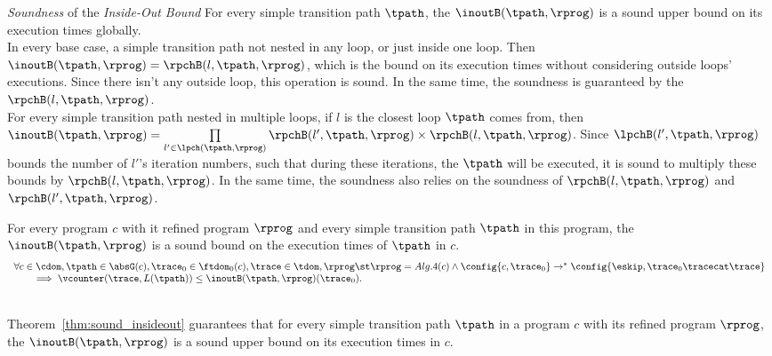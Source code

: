 \emph{Soundness} of the \emph{Inside-Out Bound}  
For every simple transition path $\tpath$, the $\inoutB(\tpath, \rprog)$
is a sound upper bound on its execution times globally.
\\
In every base case, a simple transition path not nested in any loop, or just inside one loop.
Then $\inoutB(\tpath, \rprog) = \rpchB(l, \tpath, \rprog)$, which is the bound on its execution times without considering
outside loops' executions. Since there isn't any outside loop, this operation is sound.
In the same time, the soundness is guaranteed by the $\rpchB(l, \tpath, \rprog)$.
\\
For every simple transition path nested in multiple loops, if $l$ is the closest loop $\tpath$ comes from, then
$\inoutB(\tpath, \rprog) =
\prod\limits_{l' \in \lpch(\tpath, \rprog)} \rpchB(l', \tpath, \rprog) \times \rpchB(l, \tpath, \rprog)$.
Since $\lpchB(l', \tpath, \rprog)$ bounds the number of $l'$'s iteration numbers,
such that during these iterations, the $\tpath$ will be executed,
it is sound to multiply these bounds by $\rpchB(l, \tpath, \rprog)$.
In the same time, the soundness also relies on the soundness of $\rpchB(l, \tpath, \rprog)$ and $\rpchB(l', \tpath, \rprog)$. 
%
\begin{thm}
  \label{thm:sound_insideout}
  For every program $c$ with it refined program $\rprog$ and 
  every simple transition path $\tpath$ in this program,
   the $\inoutB(\tpath, \rprog)$
is a sound bound on the execution times of $\tpath$ in $c$.
  \[
    \begin{array}{l}
    \forall c \in \cdom, \tpath \in \absG(c), \trace_0 \in \ftdom_0(c), \trace \in \tdom, \rprog \st 
    \rprog = Alg.4(c)
    \land
    \config{c, \trace_0} \to^* 
    \config{{\eskip, \trace_0 \tracecat \trace}}
    \\ \qquad
    \implies
    \vcounter(\trace, L(\tpath)) \leq \inoutB(\tpath, \rprog)(\trace_0).
    \end{array}
    \]
\end{thm}
\\
Theorem~\ref{thm:sound_insideout} guarantees that
for every simple transition path $\tpath$ in a program $c$ with its refined program $\rprog$,
the $\inoutB(\tpath, \rprog)$
is a sound upper bound on its execution times in $c$.
%
